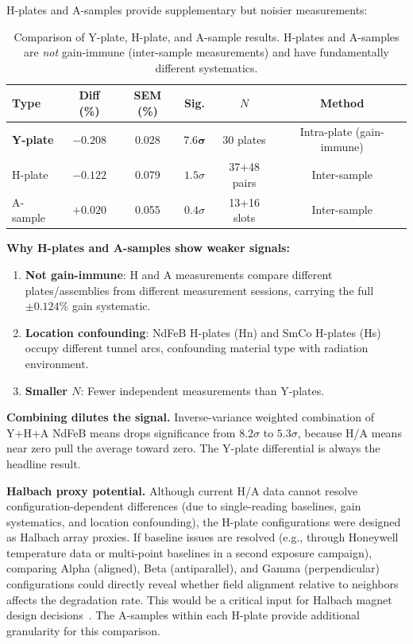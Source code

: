 \documentclass[11pt,letterpaper]{article}
\begin{document}
H-plates and A-samples provide supplementary but noisier measurements:

\begin{table}[H]
\centering
\caption{Comparison of Y-plate, H-plate, and A-sample results. H-plates and
A-samples are \emph{not} gain-immune (inter-sample measurements) and have
fundamentally different systematics.}
\label{tab:sample_types}
\begin{tabular}{@{}lccccc@{}}
\toprule
\textbf{Type} & \textbf{Diff (\%)} & \textbf{SEM (\%)} & \textbf{Sig.} &
$N$ & \textbf{Method} \\
\midrule
\textbf{Y-plate} & $\mathbf{-0.208}$ & $\mathbf{0.028}$ & $\mathbf{7.6\sigma}$ & 30 plates & Intra-plate (gain-immune) \\
H-plate & $-0.122$ & 0.079 & $1.5\sigma$ & 37+48 pairs & Inter-sample \\
A-sample & $+0.020$ & 0.055 & $0.4\sigma$ & 13+16 slots & Inter-sample \\
\bottomrule
\end{tabular}
\end{table}

\textbf{Why H-plates and A-samples show weaker signals:}
\begin{enumerate}
    \item \textbf{Not gain-immune}: H and A measurements compare different
    plates/assemblies from different measurement sessions, carrying the full
    $\pm 0.124\%$ gain systematic.
    \item \textbf{Location confounding}: NdFeB H-plates (Hn) and SmCo H-plates
    (Hs) occupy different tunnel arcs, confounding material type with radiation
    environment.
    \item \textbf{Smaller $N$}: Fewer independent measurements than Y-plates.
\end{enumerate}

\textbf{Combining dilutes the signal.} Inverse-variance weighted combination
of Y+H+A NdFeB means drops significance from $8.2\sigma$ to $5.3\sigma$,
because H/A means near zero pull the average toward zero. The Y-plate
differential is always the headline result.

\textbf{Halbach proxy potential.} Although current H/A data cannot resolve
configuration-dependent differences (due to single-reading baselines, gain
systematics, and location confounding), the H-plate configurations were
designed as Halbach array proxies. If baseline issues are resolved (e.g.,
through Honeywell temperature data or multi-point baselines in a second
exposure campaign), comparing Alpha (aligned), Beta (antiparallel), and
Gamma (perpendicular) configurations could directly reveal whether field
alignment relative to neighbors affects the degradation rate. This would be a critical input for Halbach magnet design
decisions~\cite{NGotta2024}. The A-samples within each H-plate provide
additional granularity for this comparison.
\end{document}
